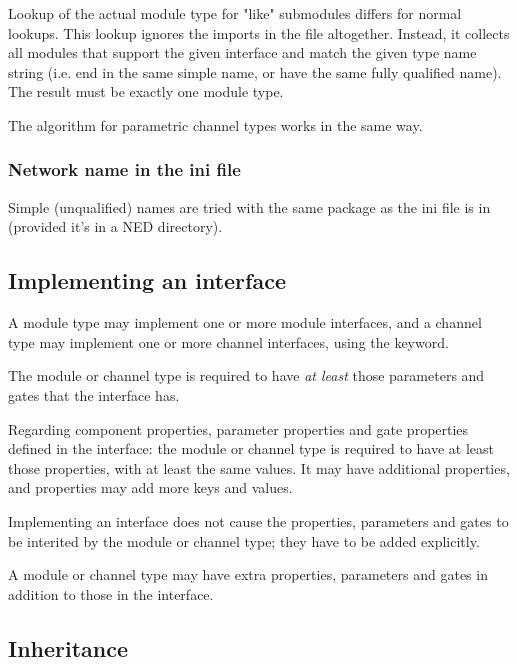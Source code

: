 Lookup of the actual module type for "like" submodules differs for normal
lookups. This lookup ignores the imports in the file altogether.
Instead, it collects all modules that support the given interface
and match the given type name string (i.e. end in the same simple name,
or have the same fully qualified name). The result must be exactly
one module type.

The algorithm for parametric channel types works in the same way.


\subsubsection{Network name in the ini file}

Simple (unqualified) names are tried with the same package as the
ini file is in (provided it's in a NED directory).


\subsection{Implementing an interface}
\label{ch-ned-ref:sec:implementing-an-interface}

A module type may implement one or more module interfaces, and a channel type
may implement one or more channel interfaces, using the 
keyword.

The module or channel type is required to have \textit{at least} those
parameters and gates that the interface has.

Regarding component properties, parameter properties and gate properties
defined in the interface: the module or channel type is required to have at
least those properties, with at least the same values. It may have
additional properties, and properties may add more keys and values.

\begin{note}
  Implementing an interface does not cause the properties, parameters and
  gates to be interited by the module or channel type; they have to be added
  explicitly.
\end{note}

\begin{note}
  A module or channel type may have extra properties, parameters and gates
  in addition to those in the interface.
\end{note}



\subsection{Inheritance}
\label{ch-ned-ref:sec:inheritance}

